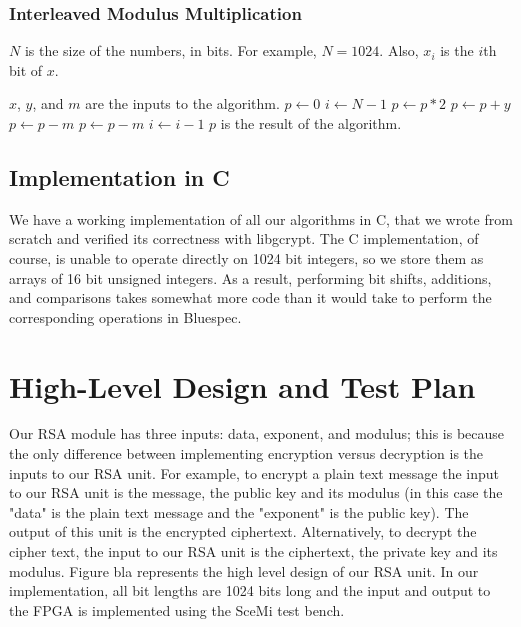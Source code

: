 \documentclass[a4paper,11pt]{report}
\begin{document}
\subsection{Interleaved Modulus Multiplication}
$N$ is the size of the numbers, in bits. For example, $N = 1024$.
Also, $x_i$ is the $i$th bit of $x$.
\begin{algorithmic}
\State $x$, $y$, and $m$ are the inputs to the algorithm.
\State $p \gets 0$
\State $i \gets N - 1$
	\State $p \gets p * 2$
		\State $p \gets p + y$
	\EndIf
		\State $p \gets p - m$
	\EndIf
		\State $p \gets p - m$
	\EndIf
  \State $i \gets i - 1$
\EndWhile
\State $p$ is the result of the algorithm.
\end{algorithmic}

\section{Implementation in C}
We have a working implementation of all our algorithms in C, that we wrote from scratch and verified its correctness with libgcrypt.  
The C implementation, of course, is unable to operate directly on 1024 bit integers, so we store them as arrays of 16 bit unsigned integers.
As a result, performing bit shifts, additions, and comparisons
takes somewhat more code than it would take to perform the corresponding operations in Bluespec.
\chapter*{High-Level Design and Test Plan} 
Our RSA module has three inputs: data, exponent, and modulus; this is because the only difference between implementing encryption versus decryption is the inputs to our RSA unit.  For example, to encrypt a plain text message the input to our RSA unit is the message, the public key and its modulus (in this case the "data" is the plain text message and the "exponent" is the public key). The output of this unit is the encrypted ciphertext.  Alternatively, to decrypt the cipher text, the input to our RSA unit is the ciphertext, the private key and its modulus.  Figure bla represents the high level design of our RSA unit.  In our implementation, all bit lengths are 1024 bits long and the input and output to the FPGA is implemented using the SceMi test bench.
\end{document}
